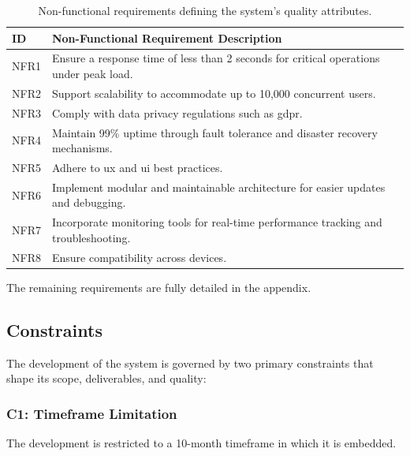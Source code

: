 \begin{table}[!htb]
\centering
\begin{tabular}{|p{}|p{}|}
\hline
\textbf{ID} & \textbf{Non-Functional Requirement Description} \\ \hline
NFR1 & Ensure a response time of less than 2 seconds for critical operations under peak load. \\ \hline
NFR2 & Support scalability to accommodate up to 10,000 concurrent users. \\ \hline
NFR3 & Comply with data privacy regulations such as \ac{gdpr}. \\ \hline
NFR4 & Maintain 99\% uptime through fault tolerance and disaster recovery mechanisms. \\ \hline
NFR5 & Adhere to \ac{ux} and \ac{ui} best practices. \\ \hline
NFR6 & Implement modular and maintainable architecture for easier updates and debugging. \\ \hline
NFR7 & Incorporate monitoring tools for real-time performance tracking and troubleshooting. \\ \hline
NFR8 & Ensure compatibility across devices. \\ \hline
\end{tabular}
\caption[Non-Functional Requirements]{Non-functional requirements defining the system's quality attributes.}
\label{tab:nonfunctional_requirements}
\end{table}


The remaining requirements are fully detailed in the appendix.


\subsection{Constraints} \label{section:constraints}

The development of the system is governed by two primary constraints that shape its scope, deliverables, and quality:

\subsubsection{C1: Timeframe Limitation}

The development is restricted to a 10-month timeframe in which it is embedded.

